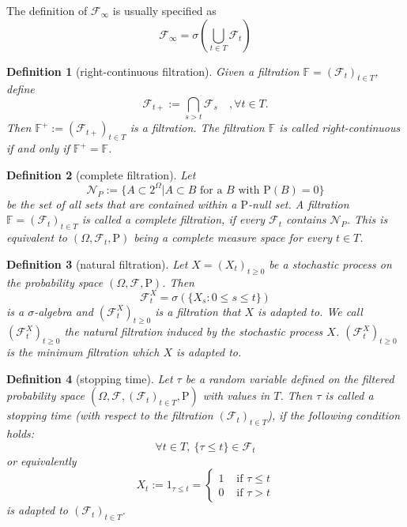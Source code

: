 \documentclass{report}
\newtheorem{definition}{Definition}[section]
\theoremstyle{nonumberplain}
\begin{document}
The definition of $\mathcal{F}_{\infty}$ is usually specified as
\[
\mathcal{F}_{\infty}=\sigma\left(\bigcup_{t\in T} \mathcal{F}_t\right)
\]

\begin{definition}[right-continuous filtration]
Given a filtration $\mathbb{F}=(\mathcal{F}_{t})_{t\in T}$, define
\[
\mathcal{F}_{t+}:=\bigcap_{s>t}\mathcal{F}_{s}\quad,\forall t\in T.
\]
Then $\mathbb{F}^+:=({\mathcal{F}}_{t+})_{t\in T}$ is a filtration. The filtration $\mathbb {F}$ is called \emph{right-continuous} if and only if $\mathbb{F}^{+}=\mathbb {F}$.
\end{definition}

\begin{definition}[complete filtration]
Let
\[\mathcal{N}_{P}:=\{A\subset 2^\Omega | A\subset B\text{ for a }B\text{ with }\mathrm{P}(B)=0\}
\]
be the set of all sets that are contained within a $\mathrm{P}$-null set. A filtration $\mathbb{F} =(\mathcal{F}_{t})_{t\in T}$ is called a \emph{complete filtration}, if every $\mathcal{F}_{t}$ contains $\mathcal{N}_{P}$. This is equivalent to $(\Omega,\mathcal{F}_{t},\mathrm{P})$ being a complete measure space for every $t\in T$.
\end{definition}

\begin{definition}[natural filtration]
	Let $X=(X_{t})_{t\ge 0}$ be a stochastic process on the probability space $(\Omega,\mathcal{F},\mathrm{P})$. Then 
	\[
	{\mathcal {F}}_{t}^X=\sigma (\{X_{s}:0\le s\le t\})
	\]
	is a $\sigma$-algebra and $(\mathcal {F}_{t}^X)_{t\ge0} $ is a filtration that $X$ is adapted to. We call $(\mathcal {F}_{t}^X)_{t\ge0} $ the \emph{natural filtration} induced by the stochastic process $X$. $(\mathcal {F}_{t}^X)_{t\ge0} $ is the minimum filtration which $X$ is adapted to.
\end{definition}

\begin{definition}[stopping time]
Let $\tau$  be a random variable defined on the filtered probability space $(\Omega,\mathcal{F},(\mathcal{F}_{t})_{t\in T },\mathrm{P})$ with values in $T$. Then $\tau$  is called a \emph{stopping time} (with respect to the filtration $(\mathcal{F}_{t})_{t\in T}$), if the following condition holds:
\[
\forall t\in T,\ \{\tau \leq t\}\in {\mathcal {F}}_{t}
\]
or equivalently
\[
X_{t} :=1_{\tau\le t}=\left\{\begin{array}{ll}{1} & {\text { if }  \tau\le t } \\ {0} & {\text { if }\tau >t}\end{array}\right.
\]
is adapted to $(\mathcal{F}_{t})_{t\in T }$.
\end{definition}
\end{document}
